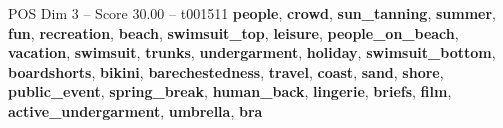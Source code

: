 \begin{textsample}{POS Dim 3 – Score 30.00 – t001511}  \label{ex:f3_pos_004}
\textbf{people}, \textbf{crowd}, \textbf{sun\_tanning}, \textbf{summer}, \textbf{fun}, \textbf{recreation}, \textbf{beach}, \textbf{swimsuit\_top}, \textbf{leisure}, \textbf{people\_on\_beach}, \textbf{vacation}, \textbf{swimsuit}, \textbf{trunks}, \textbf{undergarment}, \textbf{holiday}, \textbf{swimsuit\_bottom}, \textbf{boardshorts}, \textbf{bikini}, \textbf{barechestedness}, \textbf{travel}, \textbf{coast}, \textbf{sand}, \textbf{shore}, \textbf{public\_event}, \textbf{spring\_break}, \textbf{human\_back}, \textbf{lingerie}, \textbf{briefs}, \textbf{film}, \textbf{active\_undergarment}, \textbf{umbrella}, \textbf{bra}

\end{textsample}
